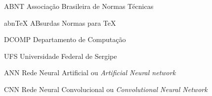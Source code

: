 
\begin{siglas}
	\item[ABNT]{Associação Brasileira de Normas Técnicas}
	\item[abnTeX]{ABsurdas Normas para TeX}
  	\item[DCOMP]{Departamento de Computação}
	\item[UFS]{Universidade Federal de Sergipe}
	\item[ANN]{Rede Neural Artificial ou \textit{Artificial Neural network}}
	\item[CNN]{Rede Neural Convolucional ou \textit{Convolutional Neural Network}}
\end{siglas}
